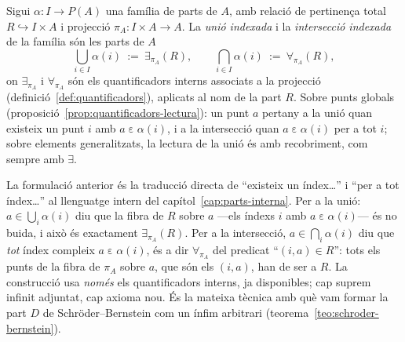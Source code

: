 \begin{definicio}\label{def:unio-interseccio-indexada}
Sigui \(\alpha\colon I\to P(A)\) una família de parts de \(A\), amb relació
de pertinença total \(R\hookrightarrow I\times A\) i projecció
\(\pi_A\colon I\times A\to A\). La \emph{unió indexada} i la
\emph{intersecció indexada} de la família són les parts de \(A\)
\[
\bigcup_{i\in I}\alpha(i)\ :=\ \exists_{\pi_A}(R),
\qquad
\bigcap_{i\in I}\alpha(i)\ :=\ \forall_{\pi_A}(R),
\]
on \(\exists_{\pi_A}\) i \(\forall_{\pi_A}\) són els quantificadors interns
associats a la projecció (definició~\ref{def:quantificadors}), aplicats al
nom de la part \(R\). Sobre punts globals (proposició~\ref{prop:quantificadors-lectura}):
un punt \(a\) pertany a la unió quan existeix un punt \(i\) amb
\(a\mathrel{\varepsilon}\alpha(i)\), i a la intersecció quan
\(a\mathrel{\varepsilon}\alpha(i)\) per a tot \(i\); sobre elements
generalitzats, la lectura de la unió és amb recobriment, com sempre amb
\(\exists\).
\end{definicio}

\begin{observacio}\label{obs:unio-interseccio-lectura}
La formulació anterior és la traducció directa de \enquote{existeix un
índex\ldots} i \enquote{per a tot índex\ldots} al llenguatge intern del
capítol~\ref{cap:parts-interna}. Per a la unió: \(a\in\bigcup_i\alpha(i)\)
diu que la fibra de \(R\) sobre \(a\) ---els índexs \(i\) amb
\(a\mathrel{\varepsilon}\alpha(i)\)--- és no buida, i això és exactament
\(\exists_{\pi_A}(R)\). Per a la intersecció, \(a\in\bigcap_i\alpha(i)\) diu
que \emph{tot} índex compleix \(a\mathrel{\varepsilon}\alpha(i)\), és a dir
\(\forall_{\pi_A}\) del predicat \enquote{\((i,a)\in R\)}: tots els punts de
la fibra de \(\pi_A\) sobre \(a\), que són els \((i,a)\), han de ser a \(R\).
La construcció usa \emph{només} els
quantificadors interns, ja disponibles; cap suprem infinit adjuntat, cap
axioma nou. És la mateixa tècnica amb què vam formar la part \(D\) de
Schröder--Bernstein com un ínfim arbitrari
(teorema~\ref{teo:schroder-bernstein}).
\end{observacio}

